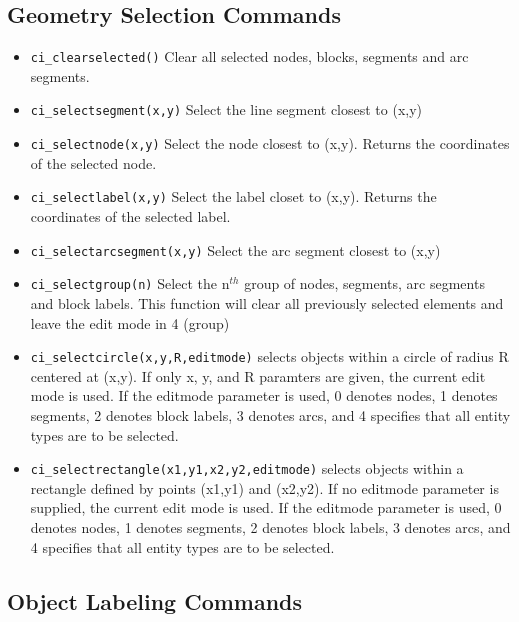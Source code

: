 \subsection{Geometry Selection Commands}

\begin{itemize}
\item {\tt ci\_clearselected()} Clear all selected nodes, blocks, segments and arc
segments.

\item {\tt ci\_selectsegment(x,y)} Select the line segment closest to (x,y)

\item {\tt ci\_selectnode(x,y)} Select the node closest to (x,y).
Returns the coordinates of the selected node.

\item {\tt ci\_selectlabel(x,y)} Select the label closet to (x,y).
Returns the coordinates of the selected label.

\item {\tt ci\_selectarcsegment(x,y)} Select the arc segment closest to (x,y)

\item {\tt ci\_selectgroup(n)} Select the n$^{th}$ group of nodes, segments, arc
segments and block labels. This function will clear all previously selected
elements and leave the edit mode in 4 (group)

\item{\tt ci\_selectcircle(x,y,R,editmode)} selects objects within a circle of radius
R centered at (x,y).  If only x, y, and R paramters are given, the current
edit mode is used.  If the editmode parameter is used, 0 denotes nodes, 1 denotes segments,
2 denotes block labels, 3 denotes arcs, and 4 specifies that all entity types are to be selected.

\item{\tt ci\_selectrectangle(x1,y1,x2,y2,editmode)} selects objects within a rectangle
defined by points (x1,y1) and (x2,y2). If no editmode parameter is supplied,
the current edit mode is used.  If the editmode parameter is used, 0 denotes nodes, 1 denotes segments,
2 denotes block labels, 3 denotes arcs, and 4 specifies that all entity types are to be selected.

\end{itemize}


\subsection{Object Labeling Commands}


